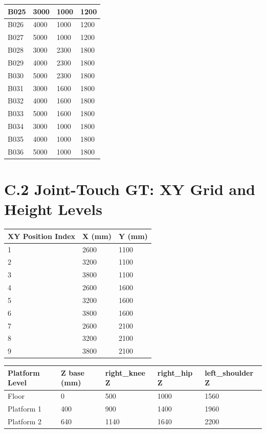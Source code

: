 \begin{table}[htbp]
\begin{tabular}{|l|l|l|l|}
\hline
B025 & 3000 & 1000 & 1200 \\
\hline
B026 & 4000 & 1000 & 1200 \\
\hline
B027 & 5000 & 1000 & 1200 \\
\hline
B028 & 3000 & 2300 & 1800 \\
\hline
B029 & 4000 & 2300 & 1800 \\
\hline
B030 & 5000 & 2300 & 1800 \\
\hline
B031 & 3000 & 1600 & 1800 \\
\hline
B032 & 4000 & 1600 & 1800 \\
\hline
B033 & 5000 & 1600 & 1800 \\
\hline
B034 & 3000 & 1000 & 1800 \\
\hline
B035 & 4000 & 1000 & 1800 \\
\hline
B036 & 5000 & 1000 & 1800 \\
\hline
\end{tabular}
\end{table}

\section*{C.2 Joint-Touch GT: XY Grid and Height Levels}

\begin{table}[htbp]
\centering
\begin{tabular}{|l|l|l|}
\hline
\textbf{XY Position Index} & \textbf{X (mm)} & \textbf{Y (mm)} \\
\hline
1 & 2600 & 1100 \\
\hline
2 & 3200 & 1100 \\
\hline
3 & 3800 & 1100 \\
\hline
4 & 2600 & 1600 \\
\hline
5 & 3200 & 1600 \\
\hline
6 & 3800 & 1600 \\
\hline
7 & 2600 & 2100 \\
\hline
8 & 3200 & 2100 \\
\hline
9 & 3800 & 2100 \\
\hline
\end{tabular}
\end{table}

\begin{table}[htbp]
\centering
\begin{tabular}{|l|l|l|l|l|}
\hline
\textbf{Platform Level} & \textbf{Z base (mm)} & \textbf{right\_knee Z} & \textbf{right\_hip Z} & \textbf{left\_shoulder Z} \\
\hline
Floor & 0 & 500 & 1000 & 1560 \\
\hline
Platform 1 & 400 & 900 & 1400 & 1960 \\
\hline
Platform 2 & 640 & 1140 & 1640 & 2200 \\
\hline
\end{tabular}
\end{table}
